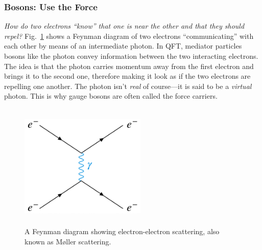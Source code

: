 \subsubsection{Bosons: Use the Force}
\emph{How do two electrons ``know'' that one is near the other and that they should repel?}
Fig.~\ref{fig:ee_scattering} shows a Feynman diagram of two electrons ``communicating'' with each other by means of an intermediate photon.
In QFT, mediator particles bosons like the photon convey information between the two interacting electrons.
The idea is that the photon carries momentum away from the first electron and brings it to the second one, therefore making it look as if the two electrons are repelling one another.
The photon isn't \emph{real} of course---it is said to be a \emph{virtual} photon.
This is why gauge bosons are often called the force carriers.
\begin{figure}[pbth]
\centering
\includegraphics[width=6cm,height=6cm,keepaspectratio]{figures/sm/ee_scattering_moeller.png}
    \caption{A Feynman diagram showing electron-electron scattering, also known as Møller scattering.} 
    \label{fig:ee_scattering}
\end{figure}

